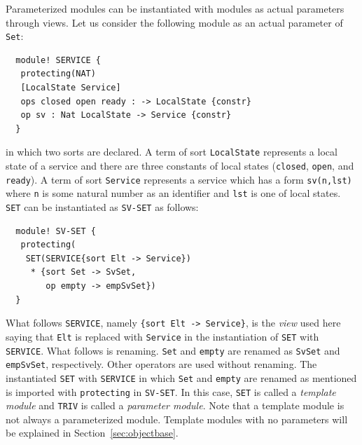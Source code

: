 \documentclass[12pt]{report}
\newcommand{\stt}[1]{{\small{\tt {#1}}}}
\begin{document}
Parameterized modules can be instantiated with modules as actual
parameters through views. Let us consider the following module
as an actual parameter of {\tt Set}:
\small
\begin{verbatim}
  module! SERVICE {
   protecting(NAT)
   [LocalState Service]
   ops closed open ready : -> LocalState {constr}
   op sv : Nat LocalState -> Service {constr}
  }
\end{verbatim}
\normalsize
in which two sorts are declared.  A term of sort {\tt LocalState}
represents a local state of a service and there are three constants of
local states ({\tt closed}, {\tt open}, and {\tt ready}).  A term of
sort {\tt Service} represents a service which has a form
\stt{sv(n,lst)} where {\tt n} is some natural number as an identifier
and {\tt lst} is one of local states.  {\tt SET} can be instantiated
as {\tt SV-SET} as follows:
\small
\begin{verbatim}
  module! SV-SET {
   protecting(
    SET(SERVICE{sort Elt -> Service})
     * {sort Set -> SvSet,
        op empty -> empSvSet})
  }
\end{verbatim}
\normalsize
What follows {\tt SERVICE}, namely \stt{\{sort Elt -> Service\}}, is
the {\it view} used here saying that {\tt Elt} is replaced with
{\tt Service} in the instantiation of {\tt SET} with
{\tt SERVICE}. What follows {\tt *} is renaming. {\tt Set} and
{\tt empty} are renamed as {\tt SvSet} and {\tt empSvSet},
respectively. Other operators are used without renaming.
The instantiated {\tt SET} with {\tt SERVICE} in which {\tt Set} and
{\tt empty} are renamed as mentioned is imported with {\tt protecting}
in {\tt SV-SET}. In this case, {\tt SET} is called a {\it template
  module} and {\tt TRIV} is called a {\it parameter module}. Note that
a template module is not always a parameterized module. Template modules
with no parameters will be explained in Section~\ref{sec:objectbase}.
\end{document}

